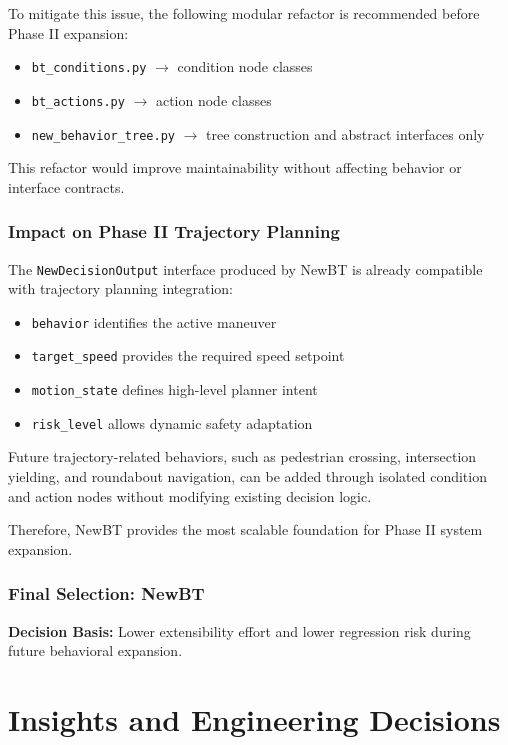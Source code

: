 \documentclass[12pt, a4paper]{report}
\begin{document}
To mitigate this issue, the following modular refactor is recommended before Phase II expansion:

\begin{itemize}
    \item \texttt{bt\_conditions.py} $\rightarrow$ condition node classes
    \item \texttt{bt\_actions.py} $\rightarrow$ action node classes
    \item \texttt{new\_behavior\_tree.py} $\rightarrow$ tree construction and abstract interfaces only
\end{itemize}

This refactor would improve maintainability without affecting behavior or interface contracts.

\subsubsection{Impact on Phase II Trajectory Planning}

The \texttt{NewDecisionOutput} interface produced by NewBT is already compatible with trajectory planning integration:

\begin{itemize}
    \item \texttt{behavior} identifies the active maneuver
    \item \texttt{target\_speed} provides the required speed setpoint
    \item \texttt{motion\_state} defines high-level planner intent
    \item \texttt{risk\_level} allows dynamic safety adaptation
\end{itemize}

Future trajectory-related behaviors, such as pedestrian crossing, intersection yielding, and roundabout navigation, can be added through isolated condition and action nodes without modifying existing decision logic.

Therefore, NewBT provides the most scalable foundation for Phase II system expansion.

\subsubsection{Final Selection: NewBT}

\textbf{Decision Basis:} Lower extensibility effort and lower regression risk during future behavioral expansion.


\section{Insights and Engineering Decisions}
\end{document}

